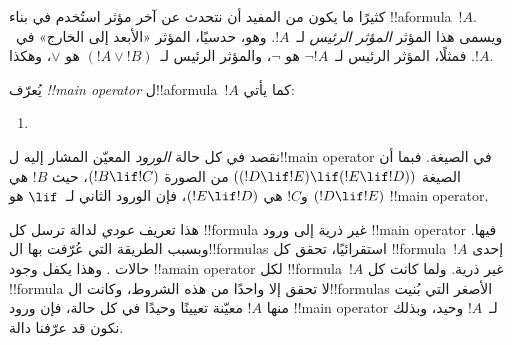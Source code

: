\documentclass[../../../include/open-logic-section]{subfiles}
\begin{document}


\begin{explain}
كثيرًا ما يكون من المفيد أن نتحدث عن آخر مؤثر استُخدم في بناء
!!a{formula}~$!A$. ويسمى هذا المؤثر \emph{المؤثر الرئيس}
لـ~$!A$. وهو، حدسيًا، المؤثر «الأبعد إلى الخارج» في~$!A$. فمثلًا،
المؤثر الرئيس لـ~$\lnot !A$ هو $\lnot$، والمؤثر الرئيس
لـ~$(!A \lor !B)$ هو $\lor$، وهكذا.
\end{explain}


\begin{defn}
يُعرّف \emph{!!{main operator}} ل!!a{formula}~$!A$ كما يأتي:
\begin{enumerate}
\item {}







\end{enumerate}
\end{defn}

نقصد في كل حالة \emph{الورود} المعيّن المشار إليه ل!!{main
operator} في الصيغة. فبما أن الصيغة $((!D \lif !E) \lif (!E \lif
!D))$ من الصورة $(!B \lif !C)$، حيث $!B$ هي $(!D \lif !E)$ و$!C$
هي $(!E \lif !D)$، فإن الورود الثاني لـ~$\lif$ هو !!{main
operator}.

\begin{explain}
هذا تعريف \emph{عودي} لدالة ترسل كل !!{formula} غير ذرية إلى ورود
!!{main operator} فيها. وبسبب الطريقة التي عُرّفت بها
ال!!{formula}s استقرائيًا، تحقق كل !!{formula}~$!A$ إحدى حالات
. وهذا يكفل وجود !!a{main operator} لكل
!!{formula}~$!A$ غير ذرية. ولما كانت كل !!{formula} لا تحقق إلا
واحدًا من هذه الشروط، وكانت ال!!{formula}s الأصغر التي بُنيت منها
$!A$ معيّنة تعيينًا وحيدًا في كل حالة، فإن ورود !!{main operator}
لـ~$!A$ وحيد، وبذلك نكون قد عرّفنا دالة.
\end{explain}
\end{document}
